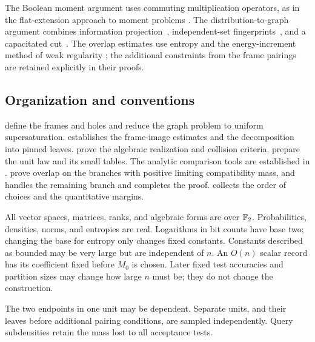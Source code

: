 The Boolean moment argument uses commuting multiplication operators,
as in the flat-extension approach to moment problems
\citep{laurentmourrain2009}. The distribution-to-graph argument
combines information projection~\citep{csiszar1975}, independent-set
fingerprints~\citep{kleitmanwinston1982,samotij2015}, and a capacitated
cut~\citep{fordfulkerson1956}. The overlap estimates use entropy
\citep{cover2006} and the energy-increment method of weak regularity
\citep{frieze1999}; the additional constraints from the frame pairings
are retained explicitly in their proofs.

\subsection{Organization and conventions}

 define the frames and holes and
reduce the graph problem to uniform supersaturation.
 establishes the frame-image estimates and the
decomposition into pinned leaves.
 prove the algebraic
realization and collision criteria.
 prepare the unit law and its small
tables. The analytic comparison tools are established in
.
 prove overlap on the branches
with positive limiting compatibility mass, and
 handles the remaining branch and completes the
proof.  collects the order of choices and the
quantitative margins.

All vector spaces, matrices, ranks, and algebraic forms are over
\(\mathbb F_2\). Probabilities, densities, norms, and entropies are real.
Logarithms in bit counts have base two; changing the base for entropy
only changes fixed constants.
Constants described as bounded may be very large but are independent
of \(n\). An \(O(n)\) scalar record has its coefficient fixed before
\(M_0\) is chosen. Later fixed test accuracies and partition sizes may
change how large \(n\) must be; they do not change the construction.

The two endpoints in one unit may be dependent. Separate units, and
their leaves before additional pairing conditions, are sampled
independently. Query subdensities retain the mass lost to all
acceptance tests.
